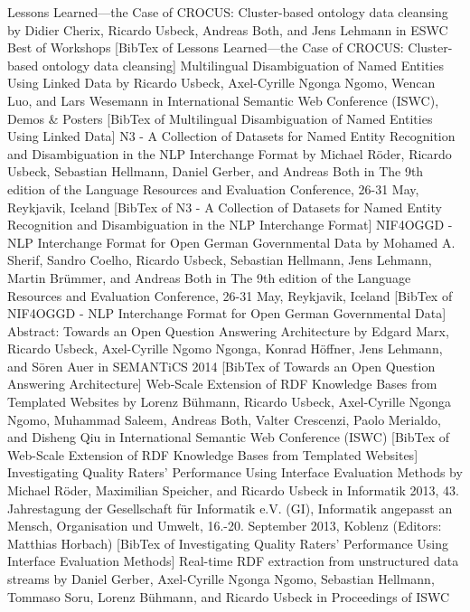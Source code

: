 Lessons Learned---the Case of CROCUS: Cluster-based ontology data cleansing by Didier Cherix, Ricardo Usbeck, Andreas Both, and Jens Lehmann in ESWC Best of Workshops [BibTex of Lessons Learned---the Case of CROCUS: Cluster-based ontology data cleansing]
Multilingual Disambiguation of Named Entities Using Linked Data by Ricardo Usbeck, Axel-Cyrille Ngonga Ngomo, Wencan Luo, and Lars Wesemann in International Semantic Web Conference (ISWC), Demos & Posters [BibTex of Multilingual Disambiguation of Named Entities Using Linked Data]
N3 - A Collection of Datasets for Named Entity Recognition and Disambiguation in the NLP Interchange Format by Michael Röder, Ricardo Usbeck, Sebastian Hellmann, Daniel Gerber, and Andreas Both in The 9th edition of the Language Resources and Evaluation Conference, 26-31 May, Reykjavik, Iceland [BibTex of N3 - A Collection of Datasets for Named Entity Recognition and Disambiguation in the NLP Interchange Format]
NIF4OGGD - NLP Interchange Format for Open German Governmental Data by Mohamed A. Sherif, Sandro Coelho, Ricardo Usbeck, Sebastian Hellmann, Jens Lehmann, Martin Brümmer, and Andreas Both in The 9th edition of the Language Resources and Evaluation Conference, 26-31 May, Reykjavik, Iceland [BibTex of NIF4OGGD - NLP Interchange Format for Open German Governmental Data] 
Abstract:
Towards an Open Question Answering Architecture by Edgard Marx, Ricardo Usbeck, Axel-Cyrille Ngomo Ngonga, Konrad Höffner, Jens Lehmann, and Sören Auer in SEMANTiCS 2014 [BibTex of Towards an Open Question Answering Architecture]
Web-Scale Extension of RDF Knowledge Bases from Templated Websites by Lorenz Bühmann, Ricardo Usbeck, Axel-Cyrille Ngonga Ngomo, Muhammad Saleem, Andreas Both, Valter Crescenzi, Paolo Merialdo, and Disheng Qiu in International Semantic Web Conference (ISWC) [BibTex of Web-Scale Extension of RDF Knowledge Bases from Templated Websites]
Investigating Quality Raters' Performance Using Interface Evaluation Methods by Michael Röder, Maximilian Speicher, and Ricardo Usbeck in Informatik 2013, 43. Jahrestagung der Gesellschaft für Informatik e.V. (GI), Informatik angepasst an Mensch, Organisation und Umwelt, 16.-20. September 2013, Koblenz (Editors: Matthias Horbach) [BibTex of Investigating Quality Raters' Performance Using Interface Evaluation Methods]
Real-time RDF extraction from unstructured data streams by Daniel Gerber, Axel-Cyrille Ngonga Ngomo, Sebastian Hellmann, Tommaso Soru, Lorenz Bühmann, and Ricardo Usbeck in Proceedings of ISWC 